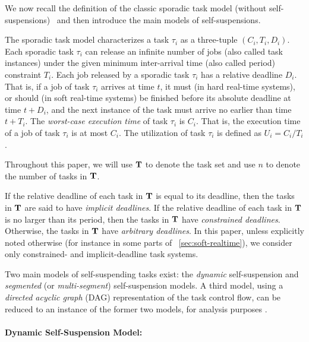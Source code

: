 \label{sec:model}

We now recall the definition of the classic sporadic task model (without self-suspensions)~\cite{Liu_1973,Mok:1983:FDP:888951} and then introduce the main models of self-suspensions. 

The sporadic task model characterizes a task $\tau_i$ as a three-tuple $(C_i,T_i,D_i)$. Each sporadic task $\tau_i$ can release an infinite number of jobs (also called task instances) under the given minimum inter-arrival time (also called period) constraint $T_i$.  Each job released by a sporadic task $\tau_i$ has a relative deadline $D_i$.  That is, if a job of task $\tau_i$ arrives at time $t$, it must (in hard real-time systems), or should (in soft real-time systems) be finished before its absolute deadline at time $t+D_i$, and the next instance of the task must arrive no earlier than time $t + T_i$.
The \emph{worst-case execution time} of task $\tau_i$ is $C_i$. That is, the execution time of a job of task $\tau_i$ is at most $C_i$. The utilization of task $\tau_i$ is defined as $U_i=C_i/T_i$.

Throughout this paper, we will use ${\bf T}$ to denote the %
task
set and use $n$ to denote the number of tasks in ${\bf T}$. 

If the relative deadline of each task in ${\bf T}$ is equal to its deadline, then the tasks in ${\bf T}$ are said to have
\emph{implicit deadlines}. If the relative deadline of
each task in ${\bf T}$ is no larger than its period, then the  tasks in ${\bf T}$ have \emph{constrained deadlines}. Otherwise, the tasks in ${\bf T}$ have \emph{arbitrary deadlines}.
In this paper, unless explicitly noted otherwise (for instance in some parts of
\mysectionref{}~\ref{sec:soft-realtime}),
we consider only constrained- and
implicit-deadline task systems.

  
Two main models of self-suspending tasks exist: the \emph{dynamic} self-suspension and \emph{segmented} (or \emph{multi-segment})
self-suspension models. A third model, using a \emph{directed acyclic graph} (DAG) representation of the task control flow, can be 
reduced to an instance of the former two models, for analysis purposes \cite{bletsas:thesis}.

\paragraph{Dynamic Self-Suspension Model:} 

